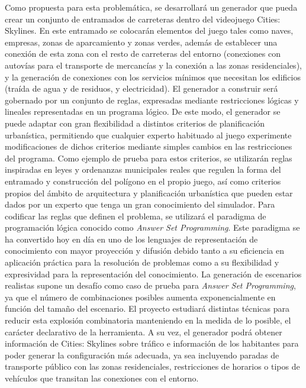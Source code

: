 Como propuesta para esta problemática, se desarrollará un generador que pueda crear un conjunto de entramados de carreteras dentro del videojuego Cities: Skylines\textcopyright. En este entramado se colocarán elementos del juego tales como naves, empresas, zonas de aparcamiento y zonas verdes, además de establecer una conexión de esta zona con el resto de carreteras del entorno (conexiones con autovías para el transporte de mercancías y la conexión a las zonas residenciales), y la generación de conexiones con los servicios mínimos que necesitan los edificios (traída de agua y de residuos, y electricidad). El generador a construir será gobernado por un conjunto de reglas, expresadas mediante restricciones lógicas y lineales representadas en un programa lógico. De este modo, el generador se puede adaptar con gran flexibilidad a distintos criterios de planificación urbanística, permitiendo que cualquier experto habituado al juego experimente modificaciones de dichos criterios mediante simples cambios en las restricciones del programa. Como ejemplo de prueba para estos criterios, se utilizarán reglas inspiradas en leyes y ordenanzas municipales reales\cite{guia_galicia} que regulen la forma del entramado y construcción del polígono en el propio juego, así como criterios propios del ámbito de arquitectura y planificación urbanística que pueden estar dados por un experto que tenga un gran conocimiento del simulador. Para codificar las reglas que definen el problema, se utilizará el paradigma de programación lógica conocido como  \textit{Answer Set Programming}\cite{asp}. Este paradigma se ha convertido hoy en día en uno de los lenguajes de representación de conocimiento con mayor proyección y difusión debido tanto a su eficiencia en aplicación práctica para la resolución de problemas como a su flexibilidad y expresividad para la representación del conocimiento. La generación de escenarios realistas\cite{5783900} supone un desafío como caso de prueba para  \textit{Answer Set Programming}, ya que el número de combinaciones posibles aumenta exponencialmente en función del tamaño del escenario. El proyecto estudiará distintas técnicas para reducir esta explosión combinatoria manteniendo en la medida de lo posible, el carácter declarativo de la herramienta. A su vez, el generador podrá obtener información de Cities: Skylines sobre tráfico e información de los habitantes para poder generar la configuración más adecuada, ya sea incluyendo paradas de transporte público con las zonas residenciales, restricciones de horarios o tipos de vehículos que transitan las conexiones con el entorno.

